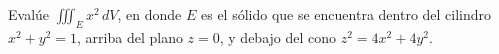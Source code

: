 \item Evalúe $\iiint_E x^2 \, dV$, en donde $E$ es el sólido que se encuentra dentro del cilindro $x^2 + y^2 = 1$, arriba del plano $z = 0$, y debajo del cono $z^2 = 4x^2 + 4y^2$.
